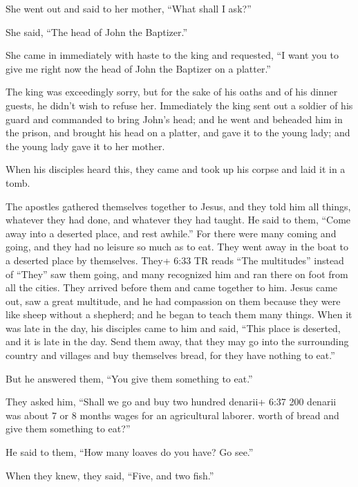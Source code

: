  She went out and said to her mother, ``What shall I ask?''

She said, ``The head of John the Baptizer.''

 She came in immediately with haste to the king and
requested, ``I want you to give me right now the head of John the
Baptizer on a platter.''

 The king was exceedingly sorry, but for the sake of his
oaths and of his dinner guests, he didn't wish to refuse her.
 Immediately the king sent out a soldier of his guard and
commanded to bring John's head; and he went and beheaded him in the
prison,  and brought his head on a platter, and gave it to
the young lady; and the young lady gave it to her mother.

 When his disciples heard this, they came and took up his
corpse and laid it in a tomb.

 The apostles gathered themselves together to Jesus, and
they told him all things, whatever they had done, and whatever they had
taught.  He said to them, ``Come away into a deserted
place, and rest awhile.'' For there were many coming and going, and they
had no leisure so much as to eat.  They went away in the
boat to a deserted place by themselves.  They+ 6:33 TR
reads ``The multitudes'' instead of ``They'' saw them going, and many
recognized him and ran there on foot from all the cities. They arrived
before them and came together to him.  Jesus came out, saw
a great multitude, and he had compassion on them because they were like
sheep without a shepherd; and he began to teach them many things.
 When it was late in the day, his disciples came to him and
said, ``This place is deserted, and it is late in the day. 
Send them away, that they may go into the surrounding country and
villages and buy themselves bread, for they have nothing to eat.''

 But he answered them, ``You give them something to eat.''

They asked him, ``Shall we go and buy two hundred denarii+ 6:37 200
denarii was about 7 or 8 months wages for an agricultural laborer. worth
of bread and give them something to eat?''

 He said to them, ``How many loaves do you have? Go see.''

When they knew, they said, ``Five, and two fish.''

